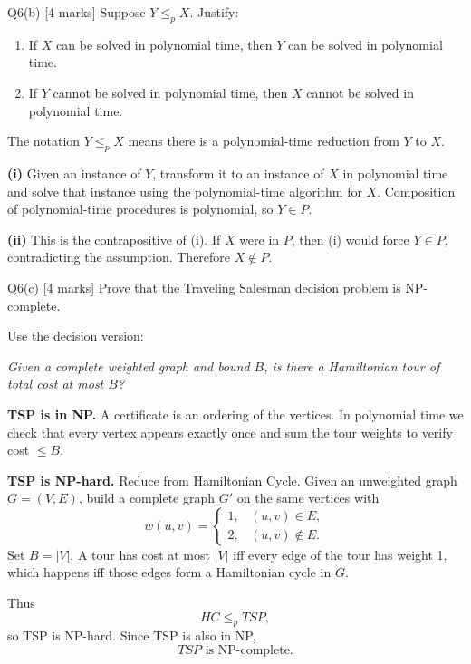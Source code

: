\documentclass[10.5pt,a4paper]{article}
\begin{document}
\begin{questionbox}{Q6(b) [4 marks]}
Suppose \(Y\le_p X\). Justify:
\begin{enumerate}[label=(\roman*),leftmargin=7mm]
\item If \(X\) can be solved in polynomial time, then \(Y\) can be solved in polynomial time.
\item If \(Y\) cannot be solved in polynomial time, then \(X\) cannot be solved in polynomial time.
\end{enumerate}
\end{questionbox}

\begin{answerbox}
The notation \(Y\le_p X\) means there is a polynomial-time reduction from \(Y\) to \(X\).

\textbf{(i)} Given an instance of \(Y\), transform it to an instance of \(X\) in polynomial time and solve that instance using the polynomial-time algorithm for \(X\). Composition of polynomial-time procedures is polynomial, so \(Y\in P\).

\textbf{(ii)} This is the contrapositive of (i). If \(X\) were in \(P\), then (i) would force \(Y\in P\), contradicting the assumption. Therefore \(X\notin P\).
\end{answerbox}

\begin{questionbox}{Q6(c) [4 marks]}
Prove that the Traveling Salesman decision problem is NP-complete.
\end{questionbox}

\begin{answerbox}
Use the decision version:

\emph{Given a complete weighted graph and bound \(B\), is there a Hamiltonian tour of total cost at most \(B\)?}

\textbf{TSP is in NP.} A certificate is an ordering of the vertices. In polynomial time we check that every vertex appears exactly once and sum the tour weights to verify cost \(\le B\).

\textbf{TSP is NP-hard.} Reduce from Hamiltonian Cycle. Given an unweighted graph \(G=(V,E)\), build a complete graph \(G'\) on the same vertices with
\[
w(u,v)=\begin{cases}
1,&(u,v)\in E,\\
2,&(u,v)\notin E.
\end{cases}
\]
Set \(B=|V|\). A tour has cost at most \(|V|\) iff every edge of the tour has weight 1, which happens iff those edges form a Hamiltonian cycle in \(G\).

Thus
\[
HC\le_p TSP,
\]
so TSP is NP-hard. Since TSP is also in NP,
\[
\boxed{TSP\text{ is NP-complete}.}
\]
\end{answerbox}
\end{document}
